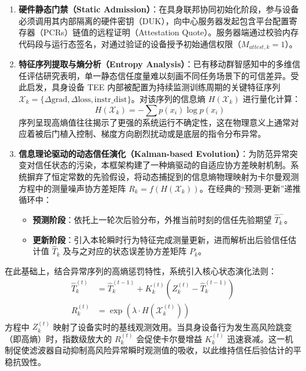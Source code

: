 \documentclass[11pt, a4paper, UTF8, fontset=fandol]{ctexart}
\begin{document}
\begin{enumerate}
    \item \textbf{硬件静态门禁（Static Admission）}：在具身联邦协同初始化阶段，参与设备必须调用其内部隔离的硬件密钥（DUK），向中心服务器发起包含平台配置寄存器（PCRs）链值的远程证明（Attestation Quote）。服务器端通过校验内存代码段与运行态签名，对通过验证的设备授予初始通信权限（$M_{attest,k}=1$）。
    \item \textbf{特征序列提取与熵分析（Entropy Analysis）}：已有移动群智感知中的多维信任评估研究表明，单一静态信任度量难以刻画不同任务场景下的可信差异\cite{li2026multidimensional}。受此启发，具身设备 TEE 内部被配置为持续监测训练周期的关键特征序列 $\mathcal{X}_k = \{ \Delta \text{grad}, \Delta \text{loss}, \text{instr\_dist} \}$。对该序列的信息熵 $H(\mathcal{X}_k)$ 进行量化计算：
          \begin{equation}
              H(\mathcal{X}_k) = -\sum p(x_i) \log p(x_i)
          \end{equation}
          序列呈现高熵值往往揭示了更强的系统运行不确定性，这在物理意义上通常对应着被后门植入控制、梯度方向剧烈扰动或是底层的指令分布异常。
    \item \textbf{信息理论驱动的动态信任演化（Kalman-based Evolution）}：为防范异常突变对信任状态的污染，本框架构建了一种熵驱动的自适应协方差映射机制。系统摒弃了恒定常数的先验假设，将动态捕捉到的信息熵物理映射为卡尔曼观测方程中的测量噪声协方差矩阵 $R_k = f(H(\mathcal{X}_k))$。在经典的“预测-更新”递推循环中：
          \begin{itemize}
              \item \textbf{预测阶段}：依托上一轮次后验分布，外推当前时刻的信任先验期望 $\hat{T}_k^-$。
              \item \textbf{更新阶段}：引入本轮瞬时行为特征完成测量更新，进而解析出后验信任估计值 $\hat{T}_k$ 及与之对应的状态误差协方差矩阵 $P_k$。
          \end{itemize}
\end{enumerate}

在此基础上，结合异常序列的高熵惩罚特性，系统引入核心状态演化法则：
\begin{align}
    \hat{T}_k^{(t)} & = \hat{T}_k^{(t-1)} + K_k^{(t)} (Z_k^{(t)} - \hat{T}_k^{(t-1)}) \\
    R_k^{(t)}       & = \exp(\lambda \cdot H(\mathcal{X}_k^{(t)}))
\end{align}
方程中 $Z_k^{(t)}$ 映射了设备实时的基线观测效用。当具身设备行为发生高风险跳变（即高熵）时，指数级放大的 $R_k^{(t)}$ 会促使卡尔曼增益 $K_k^{(t)}$ 迅速衰减。这一机制促使滤波器自动抑制高风险异常瞬时观测值的吸收，以此维持信任后验估计的平稳抗毁性。
\end{document}
